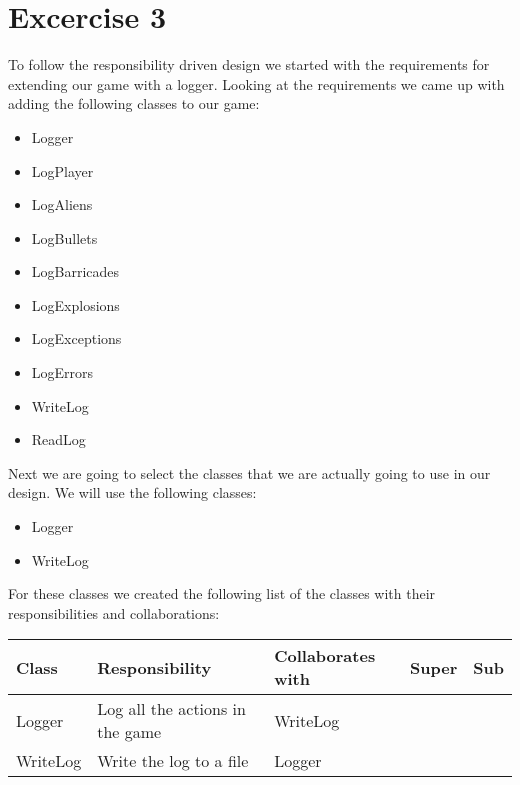 \documentclass[10pt]{article}
\begin{document}
\section*{Excercise 3}

To follow the responsibility driven design we started with the requirements for extending our game with a logger.
Looking at the requirements we came up with adding the following classes to our game:
\begin{itemize}
\item Logger
\item LogPlayer
\item LogAliens
\item LogBullets
\item LogBarricades
\item LogExplosions
\item LogExceptions
\item LogErrors
\item WriteLog
\item ReadLog
\end{itemize}

Next we are going to select the classes that we are actually going to use in our design. We will use the following classes:
\begin{itemize}
\item Logger
\item WriteLog
\end{itemize}

For these classes we created the following list of the classes with their responsibilities and collaborations:
\begin{center}
    \begin{tabular}{ | p{3cm} | p{5cm} | p{3cm} | p{2cm} | p{2cm} |}
  \hline
  Class & Responsibility & Collaborates with & Super & Sub \\ \hline
  Logger & Log all the actions in the game & WriteLog & & \\ \hline
  WriteLog & Write the log to a file & Logger & & \\ \hline
    \end{tabular}
\end{center}
\end{document}
